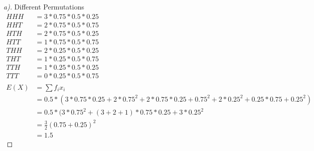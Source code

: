 \documentclass[12pt]{article}
\begin{document}
\begin{proof}[a)] Different Permutations\\
\begin{align*}
HHH &=  3*0.75*0.5*0.25\\
HHT &= 2*0.75*0.5*0.75\\
HTH &= 2*0.75*0.5*0.25\\
HTT &= 1*0.75*0.5*0.75\\
THH &= 2*0.25*0.5*0.25\\
THT &= 1*0.25*0.5*0.75\\
TTH &= 1*0.25*0.5*0.25\\
TTT &= 0*0.25*0.5*0.75 \\
\\
E(X) &= \sum f_{i}x_{i} \\
& = 0.5*( 3*0.75*0.25 + 2*0.75^{2} + 2*0.75*0.25 +  0.75^{2} +  2*0.25^{2} + 0.25*0.75 + 0.25^{2}) \\
& = 0.5*( 3*0.75^{2} + (3+2+1)*0.75*0.25 + 3*0.25^{2} \\ 
& = \frac{3}{2}(0.75+0.25)^{2} \\
& = 1.5 
\end{align*}
\end{proof}
\end{document}
